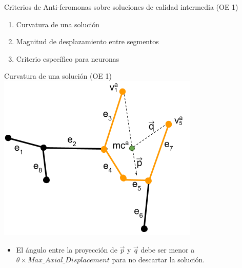 
\begin{frame}{Criterios de Anti-feromonas sobre soluciones de calidad intermedia (OE 1)}
\begin{enumerate}
    
    \item Curvatura de una soluci\'on
    \item Magnitud de desplazamiento entre segmentos
    \item Criterio espec\'ifico para neuronas
\end{enumerate}
\end{frame}


\begin{frame}{Curvatura de una soluci\'on (OE 1)}
\centering
    \includegraphics[scale=0.5]{Pictures/ant_curvature_case.png}
    \begin{itemize}
        \item El \'angulo entre la proyecci\'on de $\Vec{p}$ y $\Vec{q}$ debe ser menor a $\theta \times Max\_Axial\_Displacement$ para no descartar la soluci\'on.
    \end{itemize}
\end{frame}

